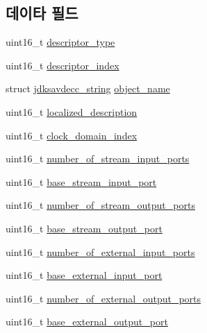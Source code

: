 \subsection*{데이타 필드}
\begin{DoxyCompactItemize}
\item 
uint16\+\_\+t \hyperlink{structjdksavdecc__descriptor__audio__unit_ab7c32b6c7131c13d4ea3b7ee2f09b78d}{descriptor\+\_\+type}
\item 
uint16\+\_\+t \hyperlink{structjdksavdecc__descriptor__audio__unit_a042bbc76d835b82d27c1932431ee38d4}{descriptor\+\_\+index}
\item 
struct \hyperlink{structjdksavdecc__string}{jdksavdecc\+\_\+string} \hyperlink{structjdksavdecc__descriptor__audio__unit_a7d1f5945a13863b1762fc6db74fa8f80}{object\+\_\+name}
\item 
uint16\+\_\+t \hyperlink{structjdksavdecc__descriptor__audio__unit_a0926f846ca65a83ad5bb06b4aff8f408}{localized\+\_\+description}
\item 
uint16\+\_\+t \hyperlink{structjdksavdecc__descriptor__audio__unit_a6608f023d147b556a49527d568abed8e}{clock\+\_\+domain\+\_\+index}
\item 
uint16\+\_\+t \hyperlink{structjdksavdecc__descriptor__audio__unit_ad00c23883f3271704e11719abc6f7ad7}{number\+\_\+of\+\_\+stream\+\_\+input\+\_\+ports}
\item 
uint16\+\_\+t \hyperlink{structjdksavdecc__descriptor__audio__unit_a8ad4ba35aee3ad22d5e946438bbaba53}{base\+\_\+stream\+\_\+input\+\_\+port}
\item 
uint16\+\_\+t \hyperlink{structjdksavdecc__descriptor__audio__unit_a6b331604e3f2b2db126dbf0a7c81b0fa}{number\+\_\+of\+\_\+stream\+\_\+output\+\_\+ports}
\item 
uint16\+\_\+t \hyperlink{structjdksavdecc__descriptor__audio__unit_a234b990d7bb2f22da0ba4bebadc71a70}{base\+\_\+stream\+\_\+output\+\_\+port}
\item 
uint16\+\_\+t \hyperlink{structjdksavdecc__descriptor__audio__unit_a7e5320abe3b528f879c3314a19269335}{number\+\_\+of\+\_\+external\+\_\+input\+\_\+ports}
\item 
uint16\+\_\+t \hyperlink{structjdksavdecc__descriptor__audio__unit_a292b30d547e9769f7ec471a9e26ae2c2}{base\+\_\+external\+\_\+input\+\_\+port}
\item 
uint16\+\_\+t \hyperlink{structjdksavdecc__descriptor__audio__unit_ae7140af180c1c9cc1f5a6a414fe26ebb}{number\+\_\+of\+\_\+external\+\_\+output\+\_\+ports}
\item 
uint16\+\_\+t \hyperlink{structjdksavdecc__descriptor__audio__unit_a3103a3898813f4104c1d1d7f984e8229}{base\+\_\+external\+\_\+output\+\_\+port}

\end{DoxyCompactItemize}

